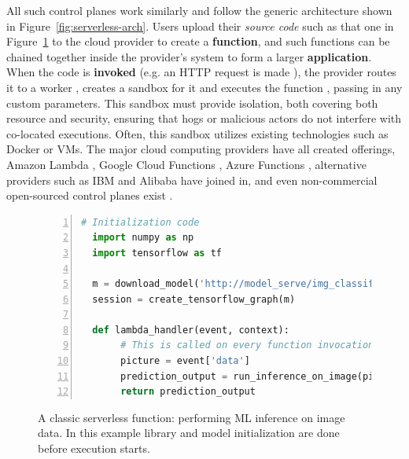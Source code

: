 All such control planes work similarly and follow the generic architecture shown in Figure~\ref{fig:serverless-arch}.
Users upload their \textit{source code}  such as that one in Figure~\ref{fig:background-lambda-example} to the cloud provider to create a \textbf{function}, and such functions can be chained together inside the provider's system to form a larger \textbf{application}.
When the code is \textbf{invoked} (e.g. an HTTP request is made ), the provider routes it to a worker , creates a sandbox for it and executes the function , passing in any custom parameters.
This sandbox must provide isolation, both covering both resource and security, ensuring that hogs or malicious actors do not interfere with co-located executions.
Often, this sandbox utilizes existing technologies such as Docker \cite{docker-main} or VMs.
The major cloud computing providers have all created offerings, Amazon Lambda \cite{lambda}, Google Cloud Functions \cite{gcp-functions}, Azure Functions \cite{azure-functions}, alternative providers such as IBM \cite{openwhisk} and Alibaba \cite{alibaba-compute} have joined in, and even non-commercial open-sourced control planes exist \cite{hendrickson2016serverless,openfaas}.

\begin{figure}
  \begin{lstlisting}[language=Python, numbers=left, frame=single, basicstyle=\footnotesize\sffamily, columns=fullflexible]
  # Initialization code 
  import numpy as np 
  import tensorflow as tf
    
  m = download_model('http://model_serve/img_classify.pb')
  session = create_tensorflow_graph(m) 
    
  def lambda_handler(event, context):
       # This is called on every function invocation 
       picture = event['data']
       prediction_output = run_inference_on_image(picture) 
       return prediction_output 
     \end{lstlisting}
     \caption{A classic serverless function: performing ML inference on image data. 
              In this example library and model initialization are done before execution starts.}
     \label{fig:background-lambda-example}
\end{figure}

